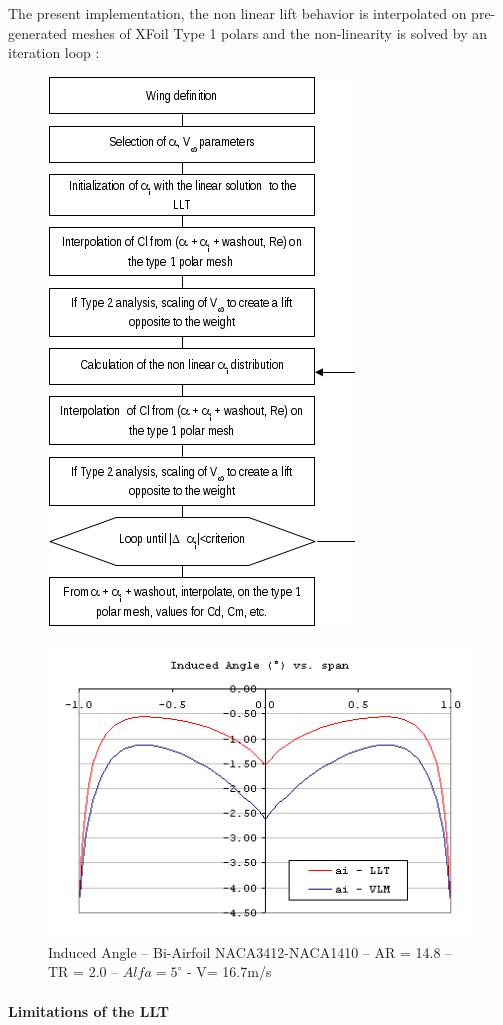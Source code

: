 \documentclass[a4paper,twoside,12pt,dvips]{article}
\begin{document}
The present implementation, the non linear lift behavior is
interpolated on pre-generated meshes of XFoil Type 1 polars and the
non-linearity is solved by an iteration loop :

\begin{figure}[htbp]
  \includegraphics[width=0.5\linewidth]{dia-01}\centering 
\end{figure}

\begin{figure}[htbp]
  \includegraphics[width=0.8\linewidth]{img-16}\centering 
  \caption{Induced Angle -- Bi-Airfoil NACA3412-NACA1410 -- AR = 14.8 -- TR = 2.0 -- $Alfa = 5^\circ$ - V= 16.7m/s}
  \label{fig:induced_angle}
\end{figure}

\paragraph{Limitations of the LLT}
\end{document}
